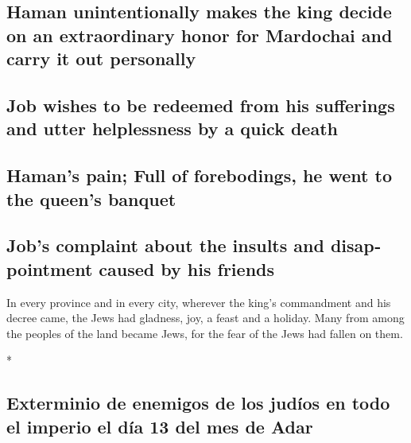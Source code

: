 \begin{paracol}{2}
\begin{otherlanguage}{english}
{\subsection{Haman unintentionally makes the king decide on an
extraordinary honor for Mardochai and carry it out
personally}\label{haman-unintentionally-makes-the-king-decide-on-an-extraordinary-honor-for-mardochai-and-carry-it-out-personally}}

\hypertarget{job-wishes-to-be-redeemed-from-his-sufferings-and-utter-helplessness-by-a-quick-death}{%
\subsection{Job wishes to be redeemed from his sufferings and utter
helplessness by a quick
death}\label{job-wishes-to-be-redeemed-from-his-sufferings-and-utter-helplessness-by-a-quick-death}}

\hypertarget{hamans-pain-full-of-forebodings-he-went-to-the-queens-banquet}{%
\subsection{Haman's pain; Full of forebodings, he went to the queen's
banquet}\label{hamans-pain-full-of-forebodings-he-went-to-the-queens-banquet}}

\hypertarget{jobs-complaint-about-the-insults-and-disappointment-caused-by-his-friends}{%
\subsection{Job's complaint about the insults and disappointment caused
by his
friends}\label{jobs-complaint-about-the-insults-and-disappointment-caused-by-his-friends}}

 In every province and in every city, wherever the king's
commandment and his decree came, the Jews had gladness, joy, a feast and
a holiday. Many from among the peoples of the land became Jews, for the
fear of the Jews had fallen on them.

\end{otherlanguage}

\switchcolumn[0]*

\hypertarget{exterminio-de-enemigos-de-los-juduxedos-en-todo-el-imperio-el-duxeda-13-del-mes-de-adar}{%
\subsection{Exterminio de enemigos de los judíos en todo el imperio el
día 13 del mes de
Adar}\label{exterminio-de-enemigos-de-los-juduxedos-en-todo-el-imperio-el-duxeda-13-del-mes-de-adar}}


\end{paracol}
